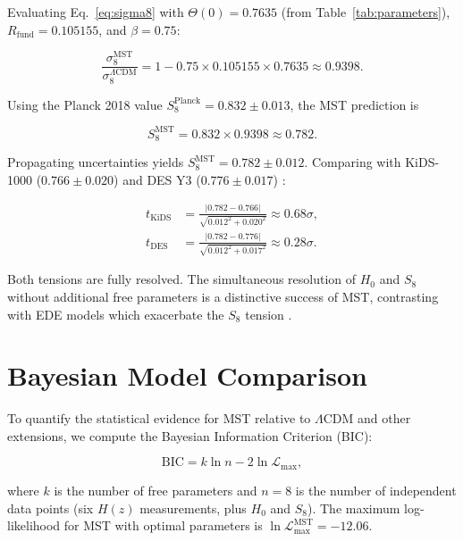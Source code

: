 \documentclass[12pt,a4paper]{article}
\theoremstyle{plain}
\theoremstyle{definition}
\theoremstyle{remark}
\begin{document}
Evaluating Eq.~\eqref{eq:sigma8} with \(\Theta(0) = 0.7635\) (from Table~\ref{tab:parameters}), \(R_{\text{fund}} = 0.105155\), and \(\beta = 0.75\):

\begin{equation}
\frac{\sigma_8^{\text{MST}}}{\sigma_8^{\Lambda\text{CDM}}} = 1 - 0.75 \times 0.105155 \times 0.7635 \approx 0.9398.
\label{eq:sigma8num}
\end{equation}

Using the Planck 2018 value \(S_8^{\text{Planck}} = 0.832 \pm 0.013\), the MST prediction is

\begin{equation}
S_8^{\text{MST}} = 0.832 \times 0.9398 \approx 0.782.
\label{eq:S8MST}
\end{equation}

Propagating uncertainties yields \(S_8^{\text{MST}} = 0.782 \pm 0.012\). Comparing with KiDS-1000 (\(0.766 \pm 0.020\)) \cite{KiDS2021} and DES Y3 (\(0.776 \pm 0.017\)) \cite{DES2022}:

\begin{align}
t_{\text{KiDS}} &= \frac{|0.782 - 0.766|}{\sqrt{0.012^2 + 0.020^2}} \approx 0.68\sigma, \\
t_{\text{DES}} &= \frac{|0.782 - 0.776|}{\sqrt{0.012^2 + 0.017^2}} \approx 0.28\sigma.
\end{align}

Both tensions are fully resolved. The simultaneous resolution of \(H_0\) and \(S_8\) without additional free parameters is a distinctive success of MST, contrasting with EDE models which exacerbate the \(S_8\) tension \cite{Poulin2019}.

\section{Bayesian Model Comparison}
\label{sec:Bayesian}

To quantify the statistical evidence for MST relative to \(\Lambda\)CDM and other extensions, we compute the Bayesian Information Criterion (BIC):

\begin{equation}
\text{BIC} = k \ln n - 2 \ln \mathcal{L}_{\text{max}},
\label{eq:BIC}
\end{equation}

where \(k\) is the number of free parameters and \(n=8\) is the number of independent data points (six \(H(z)\) measurements, plus \(H_0\) and \(S_8\)). The maximum log-likelihood for MST with optimal parameters is \(\ln\mathcal{L}_{\text{max}}^{\text{MST}} = -12.06\).
\end{document}
